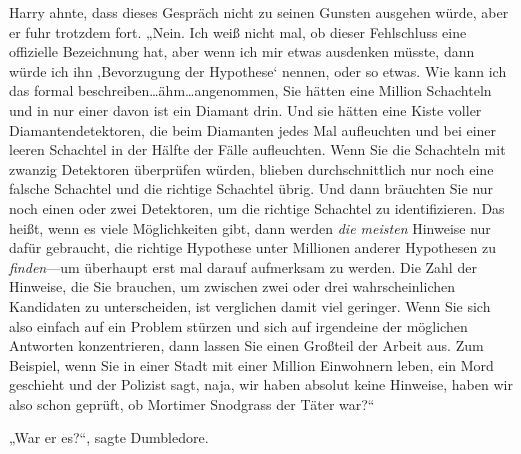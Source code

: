 Harry ahnte, dass dieses Gespräch nicht zu seinen Gunsten ausgehen würde, aber er fuhr trotzdem fort. „Nein. Ich weiß nicht mal, ob dieser Fehlschluss eine offizielle Bezeichnung hat, aber wenn ich mir etwas ausdenken müsste, dann würde ich ihn ‚Bevorzugung der Hypothese‘ nennen, oder so etwas. Wie kann ich das formal beschreiben…ähm…angenommen, Sie hätten eine Million Schachteln und in nur einer davon ist ein Diamant drin. Und sie hätten eine Kiste voller Diamantendetektoren, die beim Diamanten jedes Mal aufleuchten und bei einer leeren Schachtel in der Hälfte der Fälle aufleuchten. Wenn Sie die Schachteln mit zwanzig Detektoren überprüfen würden, blieben durchschnittlich nur noch eine falsche Schachtel und die richtige Schachtel übrig. Und dann bräuchten Sie nur noch einen oder zwei Detektoren, um die richtige Schachtel zu identifizieren. Das heißt, wenn es viele Möglichkeiten gibt, dann werden \emph{die meisten} Hinweise nur dafür gebraucht, die richtige Hypothese unter Millionen anderer Hypothesen zu \emph{finden}—um überhaupt erst mal darauf aufmerksam zu werden. Die Zahl der Hinweise, die Sie brauchen, um zwischen zwei oder drei wahrscheinlichen Kandidaten zu unterscheiden, ist verglichen damit viel geringer. Wenn Sie sich also einfach auf ein Problem stürzen und sich auf irgendeine der möglichen Antworten konzentrieren, dann lassen Sie einen Großteil der Arbeit aus. Zum Beispiel, wenn Sie in einer Stadt mit einer Million Einwohnern leben, ein Mord geschieht und der Polizist sagt, naja, wir haben absolut keine Hinweise, haben wir also schon geprüft, ob Mortimer Snodgrass der Täter war?“

„War er es?“, sagte Dumbledore.


